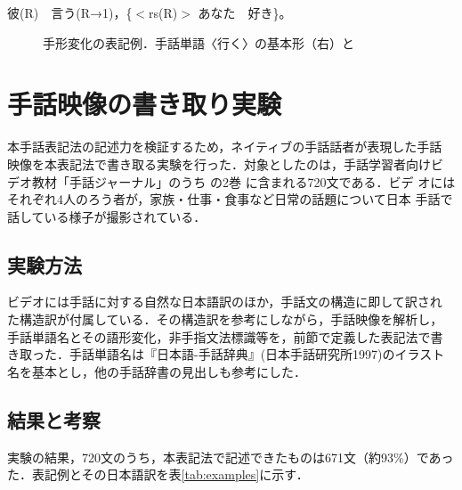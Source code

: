     \begin{exB}
彼(R)　言う(R→1)，\{$<$rs(R)$>$  あなた　好き\}。  
    \end{exB}


\begin{figure}
  \centering
  \epsfxsize=7.5cm
  \caption{手形変化の表記例．手話単語〈行く〉の基本形（右）と}
  \label{fig:referentialShift}
\end{figure}

\section{手話映像の書き取り実験}

本手話表記法の記述力を検証するため，ネイティブの手話話者が表現した手話
映像を本表記法で書き取る実験を行った．対象としたのは，手話学習者向けビ
デオ教材「手話ジャーナル」のうち
の2巻 \cite{SignFactory1997,SignFactory1999}に含まれる720文である．ビデ
オにはそれぞれ4人のろう者が，家族・仕事・食事など日常の話題について日本
手話で話している様子が撮影されている．

\subsection{実験方法}

ビデオには手話に対する自然な日本語訳のほか，手話文の構造に即して訳され
た構造訳が付属している．その構造訳を参考にしながら，手話映像を解析し，
手話単語名とその語形変化，非手指文法標識等を，前節で定義した表記法で書
き取った．手話単語名は『日本語-手話辞典』(日本手話研究所1997)のイラスト
名を基本とし，他の手話辞書の見出しも参考にした．

\subsection{結果と考察}

実験の結果，720文のうち，本表記法で記述できたものは671文（約93\%）であっ
た．表記例とその日本語訳を表\ref{tab:examples}に示す．

